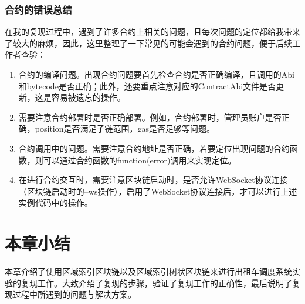 \subsubsection{合约的错误总结}

在我的复现过程中，遇到了许多合约上相关的问题，且每次问题的定位都给我带来了较大的麻烦，因此，这里整理了一下常见的可能会遇到的合约问题，便于后续工作者查验：

\begin{enumerate}
    \item 合约的编译问题。出现合约问题要首先检查合约是否正确编译，且调用的Abi和bytecode是否正确；此外，还要重点注意对应的ContractAbi文件是否更新，这是容易被遗忘的操作。
    \item 需要注意合约部署时是否正确部署。例如，合约部署时，管理员账户是否正确，position是否满足子链范围，gas是否足够等问题。
    \item 合约调用中的问题。需要注意合约地址是否正确，若要定位出现问题的合约函数，则可以通过合约函数的function(error)调用来实现定位。
    \item 在进行合约交互时，需要注意区块链启动时，是否允许WebSocket协议连接（区块链启动时的--ws操作），启用了WebSocket协议连接后，才可以进行上述实例代码中的操作。
\end{enumerate}

\section{本章小结}

本章介绍了使用区域索引区块链以及区域索引树状区块链来进行出租车调度系统实验的复现工作。大致介绍了复现的步骤，验证了复现工作的正确性，最后说明了复现过程中所遇到的问题与解决方案。